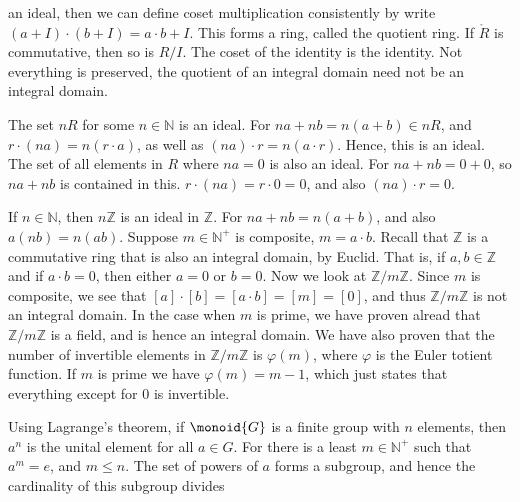 \documentclass{book}                                                           %
\begin{document}
            an ideal, then we can define coset multiplication consistently
            by write $(a+I)\cdot(b+I)=a\cdot{b}+I$. This forms a ring,
            called the quotient ring. If $\ring{R}$ is commutative, then
            so is $R/I$. The coset of the identity is the identity. Not
            everything is preserved, the quotient of an integral domain
            need not be an integral domain.
            \begin{example}
                The set $nR$ for some $n\in\mathbb{N}$ is an ideal. For
                $na+nb=n(a+b)\in{n}R$, and $r\cdot(na)=n(r\cdot{a})$, as
                well as $(na)\cdot{r}=n(a\cdot{r})$. Hence, this is an
                ideal. The set of all elements in $R$ where $na=0$ is also
                an ideal. For $na+nb=0+0$, so $na+nb$ is contained in this.
                $r\cdot(na)=r\cdot{0}=0$, and also $(na)\cdot{r}=0$.
            \end{example}
            \begin{example}
                If $n\in\mathbb{N}$, then $n\mathbb{Z}$ is an ideal in
                $\mathbb{Z}$. For $na+nb=n(a+b)$, and also $a(nb)=n(ab)$.
                Suppose $m\in\mathbb{N}^{+}$ is composite, $m=a\cdot{b}$.
                Recall that $\mathbb{Z}$ is a commutative ring that is also
                an integral domain, by Euclid. That is, if
                $a,b\in\mathbb{Z}$ and if $a\cdot{b}=0$, then either $a=0$
                or $b=0$. Now we look at $\mathbb{Z}/m\mathbb{Z}$. Since $m$
                is composite, we see that $[a]\cdot[b]=[a\cdot{b}]=[m]=[0]$,
                and thus $\mathbb{Z}/m\mathbb{Z}$ is not an integral domain.
                In the case when $m$ is prime, we have proven alread that
                $\mathbb{Z}/m\mathbb{Z}$ is a field, and is hence an
                integral domain. We have also proven that the number of
                invertible elements in $\mathbb{Z}/m\mathbb{Z}$ is
                $\varphi(m)$, where $\varphi$ is the Euler totient function.
                If $m$ is prime we have $\varphi(m)=m-1$, which just states
                that everything except for 0 is invertible.
            \end{example}
            Using Lagrange's theorem, if $\monoid{G}$ is a finite group with
            $n$ elements, then $a^{n}$ is the unital element for all
            $a\in{G}$. For there is a least $m\in\mathbb{N}^{+}$ such that
            $a^{m}=e$, and $m\leq{n}$. The set of powers of $a$ forms a
            subgroup, and hence the cardinality of this subgroup divides
\end{document}
